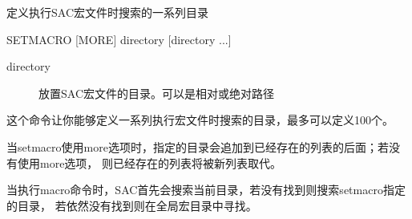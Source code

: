\label{cmd:setmacro}

定义执行SAC宏文件时搜索的一系列目录

\begin{SACSTX}
SETMACRO  [MORE] directory [directory ...]
\end{SACSTX}

\begin{description}
\item [directory] 放置SAC宏文件的目录。可以是相对或绝对路径
\end{description}

这个命令让你能够定义一系列执行宏文件时搜索的目录，最多可以定义100个。

当setmacro使用more选项时，指定的目录会追加到已经存在的列表的后面；若没有使用more选项，
则已经存在的列表将被新列表取代。

当执行macro命令时，SAC首先会搜索当前目录，若没有找到则搜索setmacro指定的目录，
若依然没有找到则在全局宏目录中寻找。

